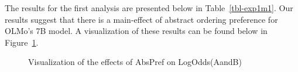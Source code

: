 \documentclass[
  12pt,
  letterpaper,
]{scrreprt}
\begin{document}
The results for the first analysis are presented below in
Table~\ref{tbl-exp1m1}. Our results suggest that there is a main-effect
of abstract ordering preference for OLMo's 7B model. A visualization of
these results can be found below in Figure~\ref{fig-exp1m1}.

\begin{table}

\caption{\label{tbl-exp1m1}Model results examining the effect of AbsPref
on LogOdds(AandB).}


\end{table}%

\begin{figure}[htbp]

\caption{\label{fig-exp1m1}Visualization of the effects of AbsPref on
LogOdds(AandB)}


\end{figure}%
\end{document}
